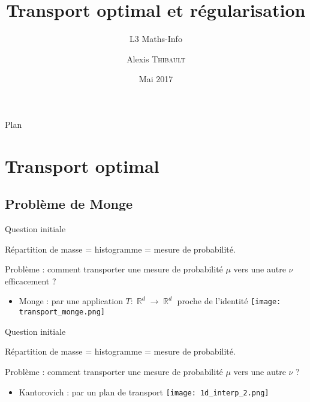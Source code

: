 \documentclass{beamer}
\title{Transport optimal et régularisation}
\subtitle{L3 Maths-Info}
\author{Alexis \textsc{Thibault}}
\institute{ENS}
\date{Mai 2017}
\DeclareMathOperator{\IR}{\mathbb{R}}
\begin{document}
\begin{frame}
  \titlepage
\end{frame}

\begin{frame}{Plan}
  \tableofcontents
\end{frame}





\section{Transport optimal}

\subsection{Problème de Monge}

\begin{frame}{Question initiale}

	Répartition de masse = histogramme = mesure de probabilité.
	
    Problème : comment transporter une mesure de probabilité $\mu$ vers une autre $\nu$ efficacement ?
	\pause
    \begin{itemize}
    \item Monge : par une application 
    $ T :     \IR^d     \rightarrow     \IR^d $ \og proche \fg de l'identité
    \texttt{[image: transport\_monge.png]}
    \end{itemize}
    
\end{frame}

\begin{frame}{Question initiale}

	Répartition de masse = histogramme = mesure de probabilité.
	
    Problème : comment transporter une mesure de probabilité $\mu$ vers une autre $\nu$ ?
    \begin{itemize}
    \item Kantorovich : par un plan de transport
    \texttt{[image: 1d\_interp\_2.png]}
    \end{itemize}
    
\end{frame}
\end{document}
